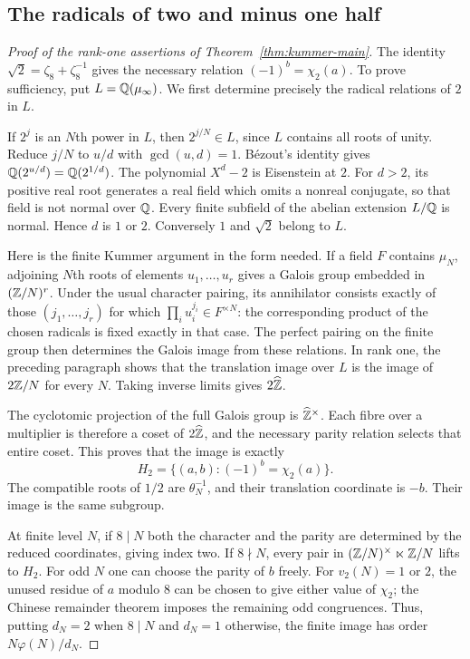 \subsection{The radicals of two and minus one half}
\begin{proof}[Proof of the rank-one assertions of Theorem~\ref{thm:kummer-main}]
The identity $\sqrt2=\zeta_8+\zeta_8^{-1}$ gives the necessary
relation $(-1)^b=\chi_2(a)$. To prove sufficiency, put
$L=\mathbb Q(\mu_\infty)$. We first determine precisely the radical
relations of $2$ in $L$.

If $2^j$ is an $N$th power in $L$, then $2^{j/N}\in L$, since
$L$ contains all roots of unity. Reduce $j/N$ to $u/d$ with
$\gcd(u,d)=1$. B\'ezout's identity gives
$\mathbb Q(2^{u/d})=\mathbb Q(2^{1/d})$. The polynomial $X^d-2$ is Eisenstein
at $2$. For $d>2$, its positive real root generates a real field
which omits a nonreal conjugate, so that field is not normal over
$\mathbb Q$. Every finite subfield of the abelian extension $L/\mathbb Q$ is
normal. Hence $d$ is $1$ or $2$. Conversely $1$ and $\sqrt2$
belong to $L$.

Here is the finite Kummer argument in the form needed. If a field
$F$ contains $\mu_N$, adjoining $N$th roots of elements $u_1,\ldots,u_r$
gives a Galois group embedded in $(\mathbb Z/N)^r$. Under the usual
character pairing, its annihilator consists exactly of those
$(j_1,\ldots,j_r)$ for which $\prod_i u_i^{j_i}\in F^{\times N}$:
the corresponding product of the chosen radicals is fixed exactly
in that case. The perfect pairing on the finite group then determines
the Galois image from these relations. In rank one, the preceding
paragraph shows that the translation image over $L$ is the image of
$2\mathbb Z/N$ for every $N$. Taking inverse limits gives $2\widehat{\mathbb Z}$.

The cyclotomic projection of the full Galois group is
$\widehat{\mathbb Z}^\times$. Each fibre over a multiplier is therefore a
coset of $2\widehat{\mathbb Z}$, and the necessary parity relation selects
that entire coset. This proves that the image is exactly
\[
 H_2=\{(a,b):(-1)^b=\chi_2(a)\}.
\]
The compatible roots of $1/2$ are $\theta_N^{-1}$, and their
translation coordinate is $-b$. Their image is the same subgroup.

At finite level $N$, if $8\mid N$ both the character and the parity
are determined by the reduced coordinates, giving index two.
If $8\nmid N$, every pair in
$(\mathbb Z/N)^\times\ltimes\mathbb Z/N$ lifts to $H_2$. For odd $N$ one can
choose the parity of $b$ freely. For $v_2(N)=1$ or $2$, the unused
residue of $a$ modulo $8$ can be chosen to give either value of
$\chi_2$; the Chinese remainder theorem imposes the remaining odd
congruences. Thus, putting $d_N=2$ when $8\mid N$ and $d_N=1$
otherwise, the finite image has order $N\varphi(N)/d_N$.


\end{proof}
